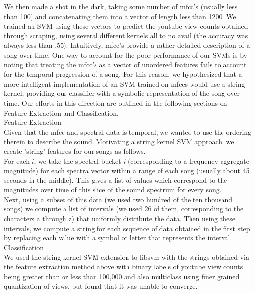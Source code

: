 \documentclass[11pt]{amsart}
\begin{document}
We then made a shot in the dark, taking some number of mfcc's (usually less than 100) and concatenating them into a vector of length less than 1200. We trained an SVM using these vectors to predict the youtube view counts obtained through scraping, using several different kernels all to no avail (the accuracy was always less than .55). 
Intuitively, mfcc's provide a rather detailed description of a song over time. One way to account for the poor performance of our SVMs is by noting that treating the mfcc's as a vector of unordered features fails to account for the temporal progression of a song. For this reason, we hypothesized that a more intelligent implementation of an SVM  trained on mfccs would use a string kernel, providing our classifier with a symbolic representation of the song over time. Our efforts in this direction are outlined in the following sections on Feature Extraction and Classification.\\

{\huge Feature Extraction \huge} \\

Given that the mfcc and spectral data is temporal, we wanted to use the ordering therein to describe the sound. Motivating a string kernel SVM approach, we create 'string' features for our songs as follows. \\

For each $i$, we take the spectral bucket $i$ (corresponding to a frequency-aggregate magnitude) for each spectra vector within a range of each song (usually about 45 seconds in the middle). This gives a list of values which correspond to the magnitudes over time of this slice of the sound spectrum for every song. \\

Next, using a subset of this data (we used two hundred of the ten thousand songs) we compute a list of intervals (we used 26 of them, corresponding to the characters a through z) that uniformly distribute the data. Then using these intervals, we compute a string for each sequence of data obtained in the first step by replacing each value with a symbol or letter that represents the interval. \\

{\huge Classification \huge} \\

We used the string kernel SVM extension to libsvm with the strings obtained via the feature extraction method above with binary labels of youtube view counts being greater than or less than 100,000 and also multiclass using finer grained quantization of views, but found that it was unable to converge.\\
\end{document}

